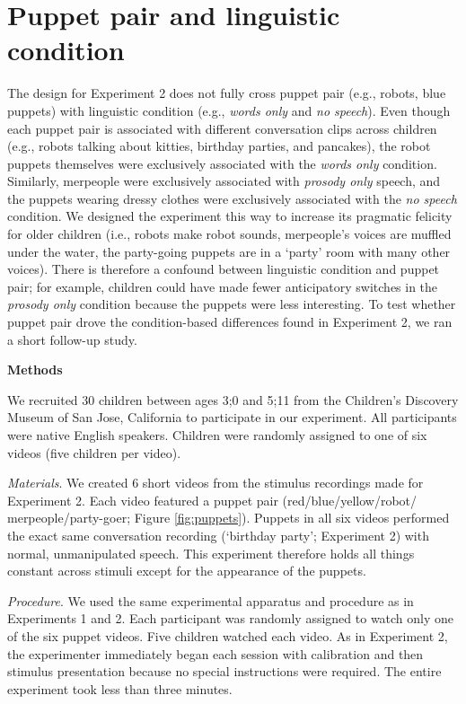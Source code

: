 \documentclass[authoryear, 12pt]{elsarticle}
\begin{document}
\section{Puppet pair and linguistic condition}
\label{sec:puppetconfound}
\setcounter{figure}{0}  
The design for Experiment 2 does not fully cross puppet pair (e.g., robots, blue puppets) with linguistic condition (e.g., \textit{words only} and \textit{no speech}). Even though each puppet pair is associated with different conversation clips across children (e.g., robots talking about kitties, birthday parties, and pancakes), the robot puppets themselves were exclusively associated with the \textit{words only} condition. Similarly, merpeople were exclusively associated with \textit{prosody only} speech, and the puppets wearing dressy clothes were exclusively associated with the \textit{no speech} condition. We designed the experiment this way to increase its pragmatic felicity for older children (i.e., robots make robot sounds, merpeople's voices are muffled under the water, the party-going puppets are in a `party' room with many other voices). There is therefore a confound between linguistic condition and puppet pair; for example, children could have made fewer anticipatory switches in the \textit{prosody only} condition because the puppets were less interesting. To test whether puppet pair drove the condition-based differences found in Experiment 2, we ran a short follow-up study.

\newpage
\noindent \textbf{Methods}
\medskip

\noindent We recruited 30 children between ages 3;0 and 5;11 from the Children's Discovery Museum of San Jose, California to participate in our experiment. All participants were native English speakers. Children were randomly assigned to one of six videos (five children per video).

\medskip
\noindent \textit{Materials}. We created 6 short videos from the stimulus recordings made for Experiment 2. Each video featured a puppet pair (red/blue/yellow/robot/ merpeople/party-goer; Figure \ref{fig:puppets}). Puppets in all six videos performed the exact same conversation recording (`birthday party'; Experiment 2) with normal, unmanipulated speech. This experiment therefore holds all things constant across stimuli except for the appearance of the puppets.
 
\medskip
\noindent \textit{Procedure}. We used the same experimental apparatus and procedure as in Experiments 1 and 2. Each participant was randomly assigned to watch only one of the six puppet videos. Five children watched each video. As in Experiment 2, the experimenter immediately began each session with calibration and then stimulus presentation because no special instructions were required. The entire experiment took less than three minutes.
\end{document}
